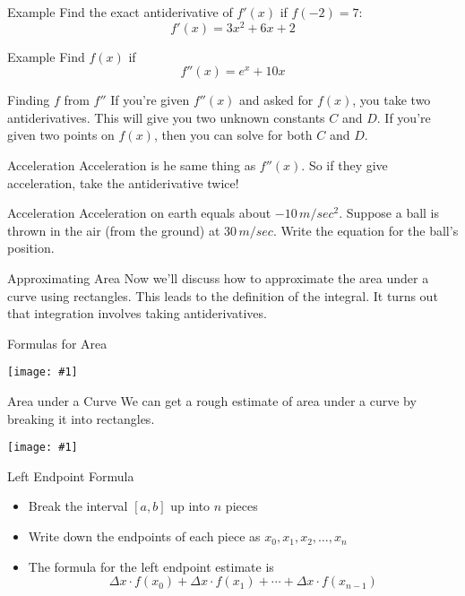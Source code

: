 \documentclass[t]{beamer}
\newcommand{\img}[1]{
\vfill
\begin{center}
\texttt{[image: \#1]}
\end{center}
\vfill
}
\begin{document}
\begin{frame}{Example}
Find the exact antiderivative of $f'(x)$ if $f(-2) = 7$:
$$f'(x) = 3x^2 + 6x + 2$$
\end{frame}

\begin{frame}{Example}
Find $f(x)$ if 
$$f''(x) = e^x + 10x$$
\end{frame}

\begin{frame}{Finding $f$ from $f''$}
If you're given $f''(x)$ and asked for $f(x)$, you take
two antiderivatives.  This will give you two unknown constants
$C$ and $D$.  If you're given two points on $f(x)$, then you 
can solve for both $C$ and $D$.
\end{frame}

\begin{frame}{Acceleration}
Acceleration is he same thing as $f''(x)$. So if they give
acceleration, take the antiderivative twice!
\end{frame}

\begin{frame}{Acceleration}
Acceleration on earth equals about $-10 \, m/sec^2$. Suppose a ball
is thrown in the air (from the ground) at $30 \, m/sec$. 
Write the equation for the ball's position.
\end{frame}

\begin{frame}{Approximating Area}
Now we'll discuss how to approximate the area under a curve
using rectangles.  This leads to the definition of the integral.
It turns out that integration involves taking antiderivatives.
\end{frame}

\begin{frame}{Formulas for Area}
\img{area}
\end{frame}

\begin{frame}{Area under a Curve}
We can get a rough estimate of area under a curve by breaking it into
rectangles.
\img{rect}
\end{frame}

\begin{frame}{Left Endpoint Formula}
\begin{itemize}
\item Break the interval $[a,b]$ up into $n$ pieces
\item Write down the endpoints of each piece as
$x_0, x_1, x_2, \ldots, x_n$
\item The formula for the left endpoint estimate is
$$\Delta x \cdot f(x_0) + \Delta x \cdot f(x_1) + \cdots +
\Delta x \cdot f(x_{n-1})$$
\end{itemize}
\end{frame}
\end{document}
